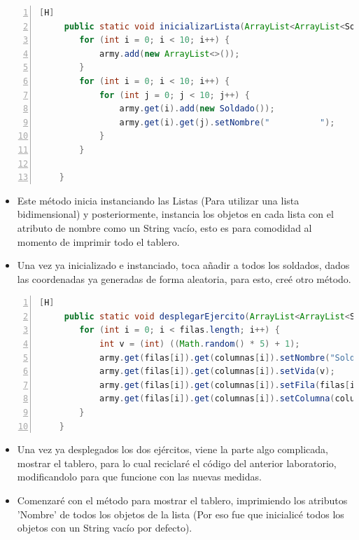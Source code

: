 \documentclass{article}
\begin{document}
	\begin{lstlisting}[language=java,caption={Inicializar la lista}, numbers=left][H]
	 public static void inicializarLista(ArrayList<ArrayList<Soldado>> army) {
        for (int i = 0; i < 10; i++) {
            army.add(new ArrayList<>());
        }
        for (int i = 0; i < 10; i++) {
            for (int j = 0; j < 10; j++) {
                army.get(i).add(new Soldado());
                army.get(i).get(j).setNombre("          ");
            }
        }

    }
	\end{lstlisting}
	\begin{itemize}	
		\item Este método inicia instanciando las Listas (Para utilizar una lista bidimensional) y posteriormente, instancia los objetos en cada lista con el atributo de nombre como un String vacío, esto es para comodidad al momento de imprimir todo el tablero.
		\item Una vez ya inicializado e instanciado, toca añadir a todos los soldados, dados las coordenadas ya generadas de forma aleatoria, para esto, creé otro método.
	\end{itemize}
	\begin{lstlisting}[language=java,caption={Desplegando nuestras tropas}, numbers=left][H]
	 public static void desplegarEjercito(ArrayList<ArrayList<Soldado>> army, int[] filas, int[] columnas, int ej) {
        for (int i = 0; i < filas.length; i++) {
            int v = (int) ((Math.random() * 5) + 1);
            army.get(filas[i]).get(columnas[i]).setNombre("Soldado" + i + "X" + ej);
            army.get(filas[i]).get(columnas[i]).setVida(v);
            army.get(filas[i]).get(columnas[i]).setFila(filas[i]);
            army.get(filas[i]).get(columnas[i]).setColumna(columnas[i]);
        }
    }
	\end{lstlisting}
	\begin{itemize}	
		\item Una vez ya desplegados los dos ejércitos, viene la parte algo complicada, mostrar el tablero, para lo cual reciclaré el código del anterior laboratorio, modificandolo para que funcione con las nuevas medidas.
		\item Comenzaré con el método para mostrar el tablero, imprimiendo los atributos 'Nombre' de todos los objetos de la lista (Por eso fue que inicialicé todos los objetos con un String vacío por defecto).
	\end{itemize}
\end{document}
